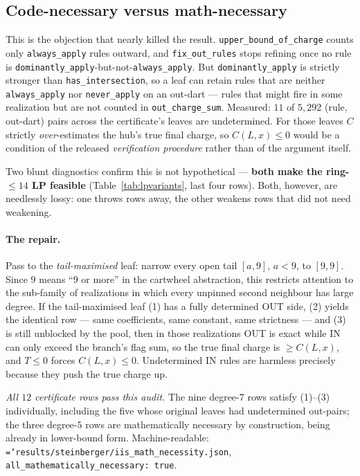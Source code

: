 \documentclass[11pt]{article}
\theoremstyle{definition}
\newcommand{\art}[1]{{\texttt{\hyphenchar\font=`\-\relax #1}}}
\begin{document}
\subsection{Code-necessary versus math-necessary}
\label{sec:necessity}

This is the objection that nearly killed the result. \texttt{upper\_bound\_of\_charge}
counts only \texttt{always\_apply} rules outward, and \texttt{fix\_out\_rules} stops
refining once no rule is \texttt{dominantly\_apply}-but-not-\texttt{always\_apply}.
But \texttt{dominantly\_apply} is strictly stronger than \texttt{has\_intersection},
so a leaf can retain rules that are neither \texttt{always\_apply} nor
\texttt{never\_apply} on an out-dart --- rules that might fire in some realization but
are not counted in \texttt{out\_charge\_sum}. Measured: $11$ of $5{,}292$
(rule, out-dart) pairs across the certificate's leaves are undetermined. For those
leaves $C$ strictly \emph{over}-estimates the hub's true final charge, so
$C(L,x)\le 0$ would be a condition of the released \emph{verification procedure}
rather than of the argument itself.

Two blunt diagnostics confirm this is not hypothetical --- \textbf{both make the
ring-$\le14$ LP feasible} (Table~\ref{tab:lpvariants}, last four rows). Both,
however, are needlessly lossy: one throws rows away, the other weakens rows that did
not need weakening.

\paragraph{The repair.} Pass to the \emph{tail-maximised} leaf: narrow every open
tail $[a,9]$, $a<9$, to $[9,9]$. Since $9$ means ``$9$ or more'' in the cartwheel
abstraction, this restricts attention to the sub-family of realizations in which
every unpinned second neighbour has large degree. If the tail-maximised leaf
(1) has a fully determined OUT side, (2) yields the identical row --- same
coefficients, same constant, same strictness --- and (3) is still unblocked by the
pool, then in those realizations OUT is exact while IN can only exceed the branch's
flag sum, so the true final charge is $\ge C(L,x)$, and $T\le 0$ forces
$C(L,x)\le 0$. Undetermined IN rules are harmless precisely because they push the
true charge up.

\emph{All $12$ certificate rows pass this audit.} The nine degree-$7$ rows satisfy
(1)--(3) individually, including the five whose original leaves had undetermined
out-pairs; the three degree-$5$ rows are mathematically necessary by construction,
being already in lower-bound form. Machine-readable:
\art{results/steinberger/iis\_math\_necessity.json},
\texttt{all\_mathematically\_necessary: true}.
\end{document}

